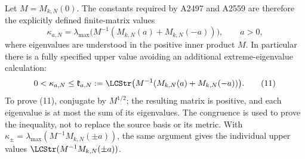 \documentclass[10pt,a4paper,oneside]{report}
\begin{document}
Let \(M=M_{k,N}(0)\). The constants required by A2497 and A2559 are
therefore the explicitly defined finite-matrix values
\[
 \kappa_{a,N}=\lambda_{\max}
       \bigl(M^{-1}(M_{k,N}(a)+M_{k,N}(-a))\bigr),\qquad a>0,
 \tag{10}
\]
where eigenvalues are understood in the positive inner product \(M\).
In particular there is a fully specified upper value avoiding an
additional extreme-eigenvalue calculation:
\[
 0<\kappa_{a,N}\le
 \mathfrak k_{a,N}:=
 \LCStr\bigl(M^{-1}(M_{k,N}(a)+M_{k,N}(-a))\bigr).
 \tag{11}
\]
To prove (11), conjugate by \(M^{1/2}\); the resulting matrix is
positive, and each eigenvalue is at most the sum of its eigenvalues.
The congruence is used to prove the inequality, not to replace the
source basis or its metric. With
\(\kappa_\pm=\lambda_{\max}(M^{-1}M_{k,N}(\pm a))\), the same
argument gives the individual upper values
\(\LCStr(M^{-1}M_{k,N}(\pm a))\).
\end{document}
